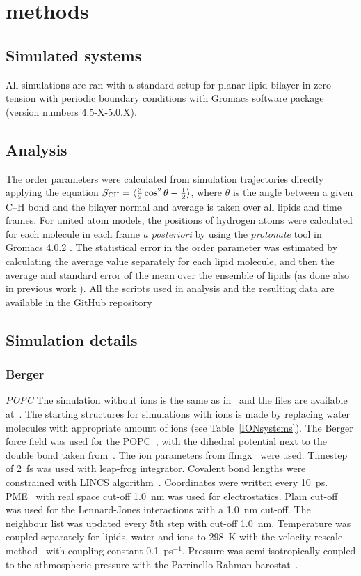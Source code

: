 \documentclass[pre,aps,floatfix,authordate1-4,twocolumn]{revtex4-1}
\begin{document}
\section{methods}

\subsection{Simulated systems}
All simulations are ran with a standard setup for planar lipid bilayer in zero tension
with periodic boundary conditions with Gromacs software package (version numbers 4.5-X-5.0.X).

\subsection{Analysis}
The order parameters were calculated from simulation trajectories directly applying the equation
$S_{{\rm CH}}=\langle \frac{3}{2}  \cos^2 \theta-\frac{1}{2} \rangle$,
where $\theta$ is the angle between a given C--H bond and the bilayer normal and average is taken
over all lipids and time frames. For united atom models, the positions of hydrogen atoms
were calculated for each molecule in each frame \textit{a posteriori} by using the {\it protonate} tool in 
Gromacs 4.0.2 \cite{gromacsMANUAL402}. 
The statistical error in the order parameter was estimated by calculating the average value separately for each lipid molecule,
and then the average and standard error of the mean over the ensemble of lipids (as done also in previous work \cite{botan15}).
All the scripts used in analysis and the resulting data are available in the GitHub repository \cite{githubIONpaper}

\subsection{Simulation details}

\subsubsection{Berger}
{\it POPC} The simulation without ions is the same as in~\cite{ferreira13} and the files are available at~\cite{bergerFILESpopc}. 
The starting structures for simulations with ions is made by replacing water molecules with appropriate amount of ions (see Table~\ref{IONsystems}).
The Berger force field was used for the POPC~\cite{berger97}, with the dihedral potential next to the double bond 
taken from~\cite{bachar04}. The ion parameters from ffmgx~\cite{straatsma88} were used.
Timestep of 2~fs was used with leap-frog integrator. Covalent bond lengths were constrained with LINCS algorithm~\cite{hess97,hess07}. 
Coordinates were written every 10~ps. PME~\cite{darden93,essman95} with real space cut-off 1.0~nm was used 
for electrostatics. Plain cut-off was used for the Lennard-Jones interactions with a 1.0~nm cut-off.
The neighbour list was updated every 5th step with cut-off 1.0~nm. Temperature was coupled separately
for lipids, water and ions to 298~K with the velocity-rescale method~\cite{bussi07} with coupling constant 0.1~ps$^{-1}$.
Pressure was semi-isotropically coupled to the athmospheric pressure with the Parrinello-Rahman barostat~\cite{parrinello81}.
\end{document}
